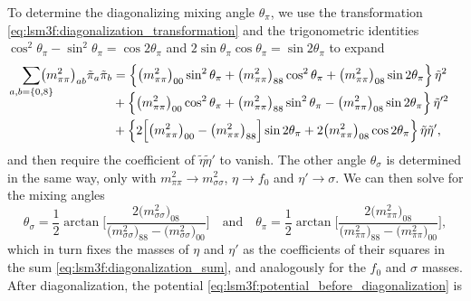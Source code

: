 To determine the diagonalizing mixing angle $\theta_\pi$,
we use the transformation \eqref{eq:lsm3f:diagonalization_transformation} and the trigonometric identities $\cos^2 \theta_\pi - \sin^2 \theta_\pi = \cos 2 \theta_\pi$ and $2 \sin\theta_\pi \cos\theta_\pi = \sin 2 \theta_\pi$ to expand
\begin{equation}
\begin{split}
	\smash{\smashoperator{\sum_{a,b=\{0,8\}}}} \big(m^2_{\pi\pi}\big)_{ab} \tilde{\pi}_a \tilde{\pi}_b &= \Big\{ \big(m^2_{\pi\pi}\big)_{00} \sin^2 \theta_\pi + \big(m^2_{\pi\pi}\big)_{88} \cos^2 \theta_\pi + \big(m^2_{\pi\pi}\big)_{08} \sin 2 \theta_\pi \Big\} \, \tilde{\eta}^2 \\
	                                                                                                   &+ \Big\{ \big(m^2_{\pi\pi}\big)_{00} \cos^2 \theta_\pi + \big(m^2_{\pi\pi}\big)_{88} \sin^2 \theta_\pi - \big(m^2_{\pi\pi}\big)_{08} \sin 2 \theta_\pi \Big\} \, \tilde{\eta}'^2 \\
	                                                                                                   &+ \Big\{ 2 \Big[ \big(m^2_{\pi\pi}\big)_{00} - \big(m^2_{\pi\pi}\big)_{88} \Big] \sin 2 \theta_\pi + 2 \big(m^2_{\pi\pi}\big)_{08} \cos 2 \theta_\pi \Big\} \, \tilde{\eta} \tilde{\eta}' ,
\end{split}
\label{eq:lsm3f:diagonalization_sum}
\end{equation}
and then require the coefficient of $\tilde{\eta} \tilde{\eta}'$ to vanish.
The other angle $\theta_\sigma$ is determined in the same way, only with $m^2_{\pi\pi} \rightarrow m^2_{\sigma\sigma}$, $\eta \rightarrow f_0$ and $\eta' \rightarrow \sigma$.
We can then solve for the mixing angles
\begin{equation}
	\theta_\sigma = \frac12 \arctan \Bigg[ \frac{2\big(m^2_{\sigma\sigma}\big)_{08}}{\big(m^2_{\sigma\sigma}\big)_{88} - \big(m^2_{\sigma\sigma}\big)_{00}} \Bigg]
	\quad \text{and} \quad
	\theta_\pi = \frac12 \arctan \Bigg[ \frac{2\big(m^2_{\pi\pi}\big)_{08}}{\big(m^2_{\pi\pi}\big)_{88} - \big(m^2_{\pi\pi}\big)_{00}} \Bigg],
\label{eq:lsm3f:mixing_angles}
\end{equation}
which in turn fixes the masses of $\eta$ and $\eta'$ as the coefficients of their squares in the sum \eqref{eq:lsm3f:diagonalization_sum}, and analogously for the $f_0$ and $\sigma$ masses.
After diagonalization, the potential \eqref{eq:lsm3f:potential_before_diagonalization}  is
